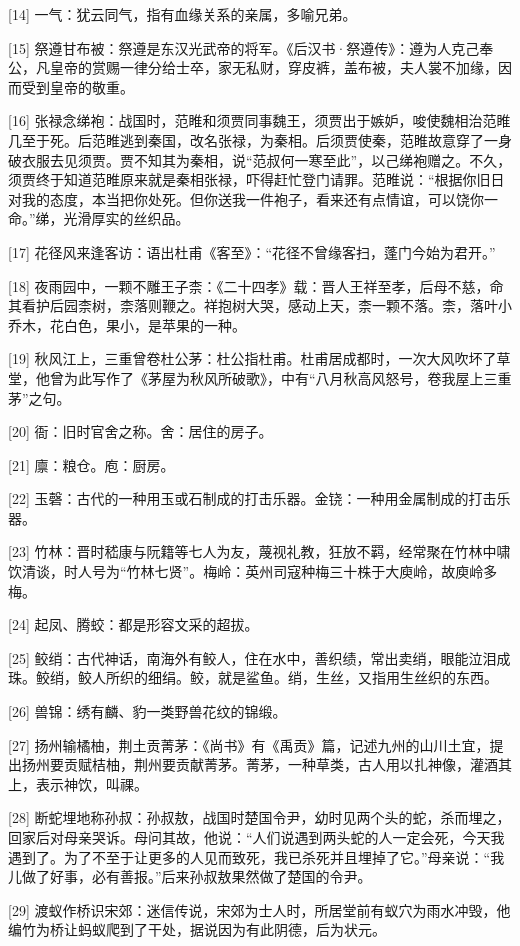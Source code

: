 \documentclass[12pt,UTF8]{ctexbook}
\begin{document}
[14] 一气：犹云同气，指有血缘关系的亲属，多喻兄弟。

[15] 祭遵甘布被：祭遵是东汉光武帝的将军。《后汉书·祭遵传》：遵为人克己奉公，凡皇帝的赏赐一律分给士卒，家无私财，穿皮裤，盖布被，夫人裳不加缘，因而受到皇帝的敬重。

[16] 张禄念绨袍：战国时，范睢和须贾同事魏王，须贾出于嫉妒，唆使魏相治范睢几至于死。后范睢逃到秦国，改名张禄，为秦相。后须贾使秦，范睢故意穿了一身破衣服去见须贾。贾不知其为秦相，说“范叔何一寒至此”，以己绨袍赠之。不久，须贾终于知道范睢原来就是秦相张禄，吓得赶忙登门请罪。范睢说：“根据你旧日对我的态度，本当把你处死。但你送我一件袍子，看来还有点情谊，可以饶你一命。”绨，光滑厚实的丝织品。

[17] 花径风来逢客访：语出杜甫《客至》：“花径不曾缘客扫，蓬门今始为君开。”

[18] 夜雨园中，一颗不雕王子柰：《二十四孝》载：晋人王祥至孝，后母不慈，命其看护后园柰树，柰落则鞭之。祥抱树大哭，感动上天，柰一颗不落。柰，落叶小乔木，花白色，果小，是苹果的一种。

[19] 秋风江上，三重曾卷杜公茅：杜公指杜甫。杜甫居成都时，一次大风吹坏了草堂，他曾为此写作了《茅屋为秋风所破歌》，中有“八月秋高风怒号，卷我屋上三重茅”之句。

[20] 衙：旧时官舍之称。舍：居住的房子。

[21] 廪：粮仓。庖：厨房。

[22] 玉磬：古代的一种用玉或石制成的打击乐器。金铙：一种用金属制成的打击乐器。

[23] 竹林：晋时嵇康与阮籍等七人为友，蔑视礼教，狂放不羁，经常聚在竹林中啸饮清谈，时人号为“竹林七贤”。梅岭：英州司寇种梅三十株于大庾岭，故庾岭多梅。

[24] 起凤、腾蛟：都是形容文采的超拔。

[25] 鲛绡：古代神话，南海外有鲛人，住在水中，善织绩，常出卖绡，眼能泣泪成珠。鲛绡，鲛人所织的细绢。鲛，就是鲨鱼。绡，生丝，又指用生丝织的东西。

[26] 兽锦：绣有麟、豹一类野兽花纹的锦缎。

[27] 扬州输橘柚，荆土贡菁茅：《尚书》有《禹贡》篇，记述九州的山川土宜，提出扬州要贡赋桔柚，荆州要贡献菁茅。菁茅，一种草类，古人用以扎神像，灌酒其上，表示神饮，叫祼。

[28] 断蛇埋地称孙叔：孙叔敖，战国时楚国令尹，幼时见两个头的蛇，杀而埋之，回家后对母亲哭诉。母问其故，他说：“人们说遇到两头蛇的人一定会死，今天我遇到了。为了不至于让更多的人见而致死，我已杀死并且埋掉了它。”母亲说：“我儿做了好事，必有善报。”后来孙叔敖果然做了楚国的令尹。

[29] 渡蚁作桥识宋郊：迷信传说，宋郊为士人时，所居堂前有蚁穴为雨水冲毁，他编竹为桥让蚂蚁爬到了干处，据说因为有此阴德，后为状元。
\end{document}

